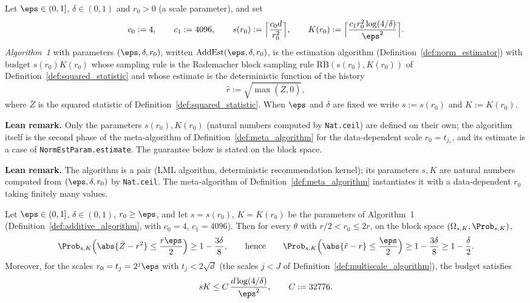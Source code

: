 \begin{definition}\label{def:additive_algorithm}
\leanok
{}
Let $\eps \in (0,1]$, $\delta \in (0,1)$ and $r_0 > 0$ (a scale parameter), and set
\[
  c_0 := 4, \qquad c_1 := 4096, \qquad
  s(r_0) := \Big\lceil \frac{c_0 d}{r_0^2} \Big\rceil, \qquad
  K(r_0) := \Big\lceil \frac{c_1 r_0^2 \log(4/\delta)}{\eps^2} \Big\rceil .
\]
\emph{Algorithm~1} with parameters $(\eps,\delta,r_0)$, written
$\mathrm{AddEst}(\eps,\delta,r_0)$, is the estimation algorithm
(Definition~\ref{def:norm_estimator}) with budget $s(r_0)K(r_0)$ whose sampling rule is the
Rademacher block sampling rule $\mathrm{RB}(s(r_0),K(r_0))$ of
Definition~\ref{def:squared_statistic} and whose estimate is the deterministic function of
the history
\[
  \hat r := \sqrt{\max(\bar Z, 0)} ,
\]
where $\bar Z$ is the squared statistic of Definition~\ref{def:squared_statistic}. When
$\eps$ and $\delta$ are fixed we write $s := s(r_0)$ and $K := K(r_0)$.
\end{definition}

\textbf{Lean remark.} Only the parameters $s(r_0), K(r_0)$ (natural numbers computed by
\texttt{Nat.ceil}) are defined on their own; the algorithm itself is the second phase of the
meta-algorithm of Definition~\ref{def:meta_algorithm} for the data-dependent scale
$r_0 = t_{j_*}$, and its estimate is a case of \texttt{NormEstParam.estimate}. The guarantee
below is stated on the block space.

\textbf{Lean remark.} The algorithm is a pair (LML algorithm, deterministic recommendation
kernel); its parameters $s, K$ are natural numbers computed from $(\eps,\delta,r_0)$ by
\texttt{Nat.ceil}. The meta-algorithm of Definition~\ref{def:meta_algorithm} instantiates it
with a data-dependent $r_0$ taking finitely many values.

\begin{theorem}\label{thm:additive_estimation}
\leanok
{}
Let $\eps \in (0,1]$, $\delta \in (0,1)$, $r_0 \ge \eps$, and let $s = s(r_0)$, $K = K(r_0)$
be the parameters of Algorithm~1 (Definition~\ref{def:additive_algorithm}, with
$c_0 = 4$, $c_1 = 4096$). Then for every
$\theta$ with $r/2 < r_0 \le 2r$, on the block space $(\Omega_{s,K}, \Prob_{s,K})$,
\[
  \Prob_{s,K}\Big( \abs{\bar Z - r^2} \le \frac{r\eps}{2} \Big) \ge 1 - \frac{3\delta}{8},
  \qquad\text{hence}\qquad
  \Prob_{s,K}\Big( \abs{\hat r - r} \le \frac{\eps}{2} \Big) \ge 1 - \frac{3\delta}{8}
  \ge 1 - \frac{\delta}{2} .
\]
Moreover, for the scales $r_0 = t_j = 2^j\eps$ with $t_j < 2\sqrt d$ (the scales $j < J$ of
Definition~\ref{def:multiscale_algorithm}), the budget satisfies
\[
  sK \le C\,\frac{d\log(4/\delta)}{\eps^2}, \qquad C := 32776 .
\]
\end{theorem}

